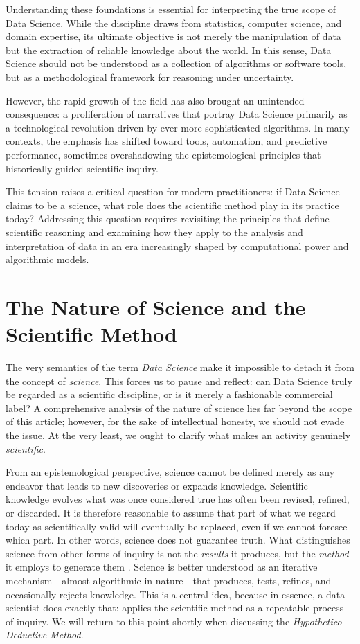 \documentclass[
  12pt,
  letterpaper,
]{book}
\begin{document}
Understanding these foundations is essential for interpreting the true
scope of Data Science. While the discipline draws from statistics,
computer science, and domain expertise, its ultimate objective is not
merely the manipulation of data but the extraction of reliable knowledge
about the world. In this sense, Data Science should not be understood as
a collection of algorithms or software tools, but as a methodological
framework for reasoning under uncertainty.

However, the rapid growth of the field has also brought an unintended
consequence: a proliferation of narratives that portray Data Science
primarily as a technological revolution driven by ever more
sophisticated algorithms. In many contexts, the emphasis has shifted
toward tools, automation, and predictive performance, sometimes
overshadowing the epistemological principles that historically guided
scientific inquiry.

This tension raises a critical question for modern practitioners: if
Data Science claims to be a science, what role does the scientific
method play in its practice today? Addressing this question requires
revisiting the principles that define scientific reasoning and examining
how they apply to the analysis and interpretation of data in an era
increasingly shaped by computational power and algorithmic models.

\section{The Nature of Science and the Scientific
Method}\label{the-nature-of-science-and-the-scientific-method}

The very semantics of the term \emph{Data Science} make it impossible to
detach it from the concept of \emph{science}. This forces us to pause
and reflect: can Data Science truly be regarded as a scientific
discipline, or is it merely a fashionable commercial label? A
comprehensive analysis of the nature of science lies far beyond the
scope of this article; however, for the sake of intellectual honesty, we
should not evade the issue. At the very least, we ought to clarify what
makes an activity genuinely \emph{scientific}.

From an epistemological perspective, science cannot be defined merely as
any endeavor that leads to new discoveries or expands knowledge.
Scientific knowledge evolves what was once considered true has often
been revised, refined, or discarded. It is therefore reasonable to
assume that part of what we regard today as scientifically valid will
eventually be replaced, even if we cannot foresee which part. In other
words, science does not guarantee truth. What distinguishes science from
other forms of inquiry is not the \emph{results} it produces, but the
\emph{method} it employs to generate them
. Science is better
understood as an iterative mechanism---almost algorithmic in
nature---that produces, tests, refines, and occasionally rejects
knowledge. This is a central idea, because in essence, a data scientist
does exactly that: applies the scientific method as a repeatable process
of inquiry. We will return to this point shortly when discussing the
\emph{Hypothetico-Deductive Method}.
\end{document}
